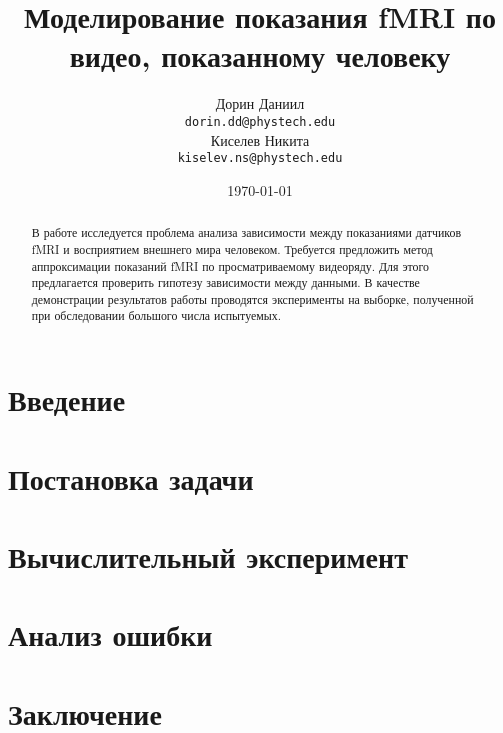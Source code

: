 \documentclass[a4paper, 12pt]{article}
\title{Моделирование показания fMRI по видео, показанному человеку}
\author{
	Дорин Даниил \\
	\texttt{dorin.dd@phystech.edu} \\
	\And
	Киселев Никита \\
	\texttt{kiselev.ns@phystech.edu} \\
}
\date{\today}
\begin{document}
\maketitle

\begin{abstract}
	
	В работе исследуется проблема анализа зависимости между показаниями датчиков fMRI
	и восприятием внешнего мира человеком. 
	Требуется предложить метод аппроксимации показаний fMRI по просматриваемому видеоряду.
	Для этого предлагается проверить гипотезу зависимости между данными.
	В качестве демонстрации результатов работы проводятся эксперименты на выборке, полученной
	при обследовании большого числа испытуемых.

\end{abstract}



\section{Введение}

\section{Постановка задачи}

\section{Вычислительный эксперимент}

\section{Анализ ошибки}

\section{Заключение}

%
%
\end{document}
